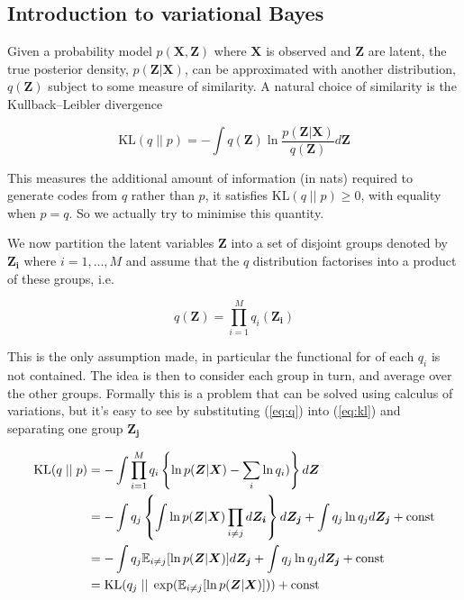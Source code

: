 \documentclass{article}
\begin{document}
\subsection{Introduction to variational Bayes}

Given a probability model $p(\boldsymbol{X}, \boldsymbol{Z})$ where $\boldsymbol{X}$ is observed and $\boldsymbol{Z}$ are latent, the true posterior density, $p(\boldsymbol{Z} | \boldsymbol{X})$, can be approximated with another distribution, $q(\boldsymbol{Z})$ subject to some measure of similarity. A natural choice of similarity is the Kullback–Leibler divergence

\begin{equation}
\label{eq:kl}
   \text{KL} (q\; ||\; p) = -\int q(\boldsymbol{Z}) \ln \frac{p(\boldsymbol{Z} | \boldsymbol{X})}{q(\boldsymbol{Z})} d\boldsymbol{Z}
\end{equation}

This measures the additional amount of information (in nats) required to generate codes from $q$ rather than $p$, it satisfies $\text{KL}(q\; ||\; p) \ge 0$, with equality when $p = q$. So we actually try to minimise this quantity.

We now partition the latent variables $\boldsymbol{Z}$ into a set of disjoint groups denoted by $\boldsymbol{Z_i}$ where $i = 1, \dots, M$ and assume that the $q$ distribution factorises into a product of these groups, i.e.

\begin{equation}
\label{eq:q}
  q(\boldsymbol{Z}) = \prod_{i = 1}^M q_i(\boldsymbol{Z_i})
\end{equation}

This is the only assumption made, in particular the functional for of each $q_i$ is not contained. The idea is then to consider each group in turn, and average over the other groups. Formally this is a problem that can be solved using calculus of variations, but it's easy to see by substituting (\ref{eq:q}) into (\ref{eq:kl}) and separating one group $\boldsymbol{Z_j}$

\begin{align}
    \text{KL}(q\; ||\; p) &= -\int \prod_{i = 1}^M q_i \left\{ \ln p(\boldsymbol{Z} | \boldsymbol{X}) - \sum_i \ln q_i) \right\} d \boldsymbol{Z}\notag \\
    &= -\int q_j \left\{ \int \ln p(\boldsymbol{Z} | \boldsymbol{X}) \prod_{i \ne j} d \boldsymbol{Z_i} \right\} d \boldsymbol{Z_j} + \int q_j \ln q_j d \boldsymbol{Z_j} + \text{const}\notag\\
    &= -\int q_j \mathbb{E}_{i \ne j}[\ln p(\boldsymbol{Z} | \boldsymbol{X})] d \boldsymbol{Z_j} + \int q_j \ln q_j d \boldsymbol{Z_j} + \text{const}\notag\\
    &= \text{KL}(q_j\; ||\; \exp (\mathbb{E}_{i \ne j}[\ln p(\boldsymbol{Z} | \boldsymbol{X})])) + \text{const}
\end{align}
\end{document}
